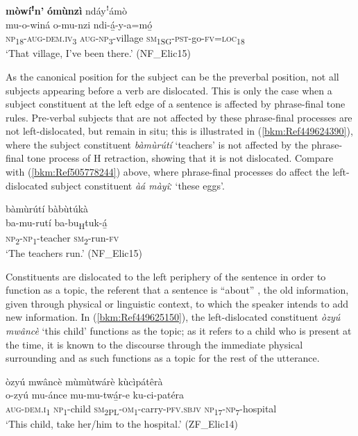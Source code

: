 \ea
\label{bkm:Ref505778247}
\textbf{mòwíꜝ}\textbf{n’} \textbf{ómùnzì} ndáyꜝámò\\
\gll mu-o-winá    o-mu-nzi    ndi-á̲-y-a=mó̲\\
\textsc{np}\textsubscript{18}-\textsc{aug}-\textsc{dem}.\textsc{iv}\textsubscript{3}  \textsc{aug}-\textsc{np}\textsubscript{3}-village  \textsc{sm}\textsubscript{1SG}-\textsc{pst}-go-\textsc{fv}=\textsc{loc}\textsubscript{18}\\
\glt ‘That village, I’ve been there.’ (NF\_Elic15)
\z

As the canonical position for the subject can be the preverbal position, not all subjects appearing before a verb are dislocated. This is only the case when a subject constituent at the left edge of a sentence is affected by phrase-final tone rules. Pre-verbal subjects that are not affected by these phrase-final processes are not left-dislocated, but remain in situ; this is illustrated in (\ref{bkm:Ref449624390}), where the subject constituent \textit{bàmùrútí} ‘teachers’ is not affected by the phrase-final tone process of H retraction, showing that it is not dislocated. Compare with (\ref{bkm:Ref505778244}) above, where phrase-final processes do affect the left-dislocated subject constituent \textit{àá màyîː} ‘these eggs’.

\ea
\label{bkm:Ref449624390}
bàmùrútí bàbùtúkà\\
\gll ba-mu-rutí    ba-bu\textsubscript{H}tuk-á̲\\
\textsc{np}\textsubscript{2}-\textsc{np}\textsubscript{1}-teacher  \textsc{sm}\textsubscript{2}-run-\textsc{fv}\\
\glt ‘The teachers run.’ (NF\_Elic15)
\z

Constituents are dislocated to the left periphery of the sentence in order to function as a topic, the referent that a sentence is “about” \citep[114]{Lambrecht1994}, the old information, given through physical or linguistic context, to which the speaker intends to add new information. In (\ref{bkm:Ref449625150}), the left-dislocated constituent \textit{òzyú mwâncè} ‘this child’ functions as the topic; as it refers to a child who is present at the time, it is known to the discourse through the immediate physical surrounding and as such functions as a topic for the rest of the utterance.

\ea
\label{bkm:Ref449625150}
òzyú mwâncè mùmùtwárè kùcìpátêrà\\
\gll o-zyú    mu-ánce  mu-mu-twá̲r-e    ku-ci-patéra\\
\textsc{aug}-\textsc{dem}.\textsc{i}\textsubscript{1}  \textsc{np}\textsubscript{1}-child  \textsc{sm}\textsubscript{2PL}-\textsc{om}\textsubscript{1}-carry-\textsc{pfv}.\textsc{sbjv}  \textsc{np}\textsubscript{17}-\textsc{np}\textsubscript{7}-hospital\\
\glt ‘This child, take her/him to the hospital.’ (ZF\_Elic14)
\z

